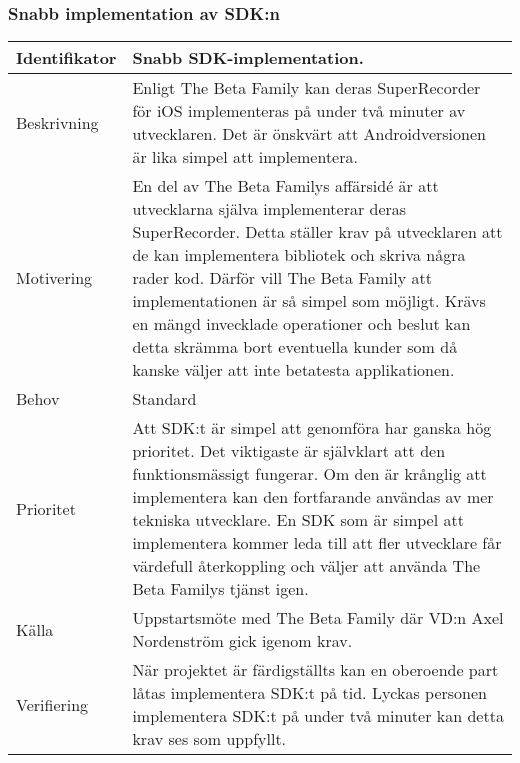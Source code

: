 \subsubsection{Snabb implementation av SDK:n}
\begin{tabular}{ | p{65pt} | p{300pt} |}
  \hline
  Identifikator &
  Snabb SDK-implementation.
  \\ \hline
  Beskrivning & 
  Enligt The Beta Family kan deras SuperRecorder för iOS implementeras på under två minuter av utvecklaren. Det är önskvärt att Androidversionen är lika simpel att implementera.
  \\ \hline
  Motivering &
  En del av The Beta Familys affärsidé är att utvecklarna själva implementerar deras SuperRecorder. Detta ställer krav på utvecklaren att de kan implementera bibliotek och skriva några rader kod. Därför vill The Beta Family att implementationen är så simpel som möjligt. Krävs en mängd invecklade operationer och beslut kan detta skrämma bort eventuella kunder som då kanske väljer att inte betatesta applikationen.
  \\ \hline
  Behov &
  Standard
  \\ \hline
  Prioritet &
  Att SDK:t är simpel att genomföra har ganska hög prioritet. Det viktigaste är självklart att den funktionsmässigt fungerar. Om den är krånglig att implementera kan den fortfarande användas av mer tekniska utvecklare. En SDK som är simpel att implementera kommer leda till att fler utvecklare får värdefull återkoppling och väljer att använda The Beta Familys tjänst igen.
  \\ \hline
  Källa &
  Uppstartsmöte med The Beta Family där VD:n Axel Nordenström gick igenom krav.
  \\ \hline
  Verifiering &
  När projektet är färdigställts kan en oberoende part låtas implementera SDK:t på tid. Lyckas personen implementera SDK:t på under två minuter kan detta krav ses som uppfyllt.
  \\ \hline
\end{tabular}

